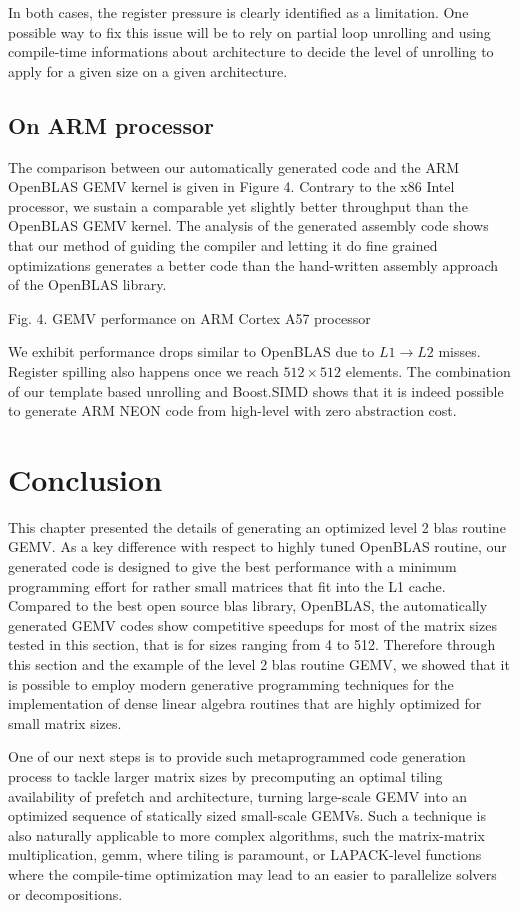 \documentclass[../main]{subfiles}
\begin{document}
In both cases, the register pressure is clearly identified as a
limitation. One possible way to fix this issue will be to rely
on partial loop unrolling and using compile-time informations
about architecture to decide the level of unrolling to apply for
a given size on a given architecture.

\subsection{
  On ARM processor
}

The comparison between our automatically generated code
and the ARM OpenBLAS GEMV kernel is given in Figure 4.
Contrary to the x86 Intel processor, we sustain a comparable
yet slightly better throughput than the OpenBLAS GEMV
kernel. The analysis of the generated assembly code shows
that our method of guiding the compiler and letting it do
fine grained optimizations generates a better code than the
hand-written assembly approach of the OpenBLAS library.


Fig. 4. GEMV performance on ARM Cortex A57 processor

We exhibit performance drops similar to OpenBLAS due to
$L1 \rightarrow L2$ misses. Register spilling also happens once we reach
$512 \times 512$ elements. The combination of our template based
unrolling and Boost.SIMD shows that it is indeed possible to
generate ARM NEON code from high-level \cpp with zero
abstraction cost.

\section{
  Conclusion
}

This chapter presented the details of generating an optimized
level 2 \gls{blas} routine GEMV. As a key difference with respect
to highly tuned OpenBLAS routine, our generated code
is designed to give the best performance with a minimum
programming effort for rather small matrices that fit into the
L1 cache. Compared to the best open source \gls{blas} library,
OpenBLAS, the automatically generated GEMV codes show
competitive speedups for most of the matrix sizes tested in
this section, that is for sizes ranging from 4 to 512. Therefore
through this section and the example of the level 2 \gls{blas}
routine GEMV, we showed that it is possible to employ modern
generative programming techniques for the implementation
of dense linear algebra routines that are highly optimized for
small matrix sizes.

One of our next steps is to provide such metaprogrammed
code generation process to tackle larger matrix sizes by precomputing
an optimal tiling availability of prefetch and architecture,
turning large-scale GEMV into an optimized sequence of
statically sized small-scale GEMVs. Such a technique is also naturally
applicable to more complex algorithms, such the matrix-matrix
multiplication, gemm, where tiling is paramount, or
LAPACK-level functions where the compile-time optimization
may lead to an easier to parallelize solvers or decompositions.
\end{document}
